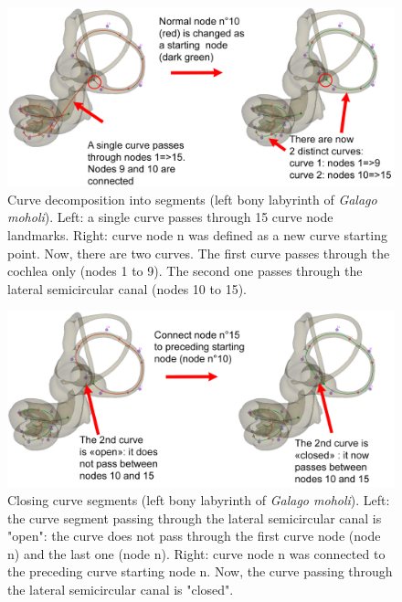 \begin{figure}
  \centering
  \includegraphics[scale=0.23]{images/10/change_node_as_curve_starting_point.png} 
	\caption{Curve decomposition into segments (left bony labyrinth of \textit{Galago moholi}). Left: a single curve passes through 15 curve node landmarks. Right: curve node n was defined as a new curve starting point. Now, there are two curves. The first curve passes through the cochlea only (nodes 1 to 9). The second one passes through the lateral semicircular canal (nodes 10 to 15).}
\label{starting_node}
 
\end{figure}


\begin{figure}
  \centering
  \includegraphics[scale=0.23]{images/10/connect_node_to_preceding_starting_point.png} 
	\caption{Closing curve segments (left bony labyrinth of \textit{Galago moholi}). Left: the curve segment passing through the lateral semicircular canal is "open": the curve does not pass through the first curve node (node n) and the last one (node n). Right: curve node n was connected to the preceding curve starting node n. Now, the curve passing through the lateral semicircular canal is "closed".}
\label{connect_to_preceding_starting_node}
\end{figure}

